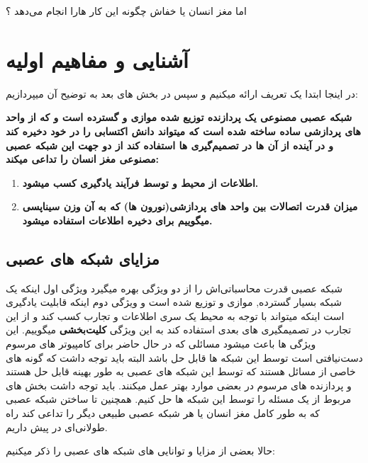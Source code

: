 \documentclass[11pt,a4paper,twocolumn]{article}
\begin{document}
اما مغز انسان یا خفاش چگونه این کار هارا انجام می‌دهد ؟ 
\section{آشنایی و مفاهیم اولیه}
در اینجا ابتدا یک تعریف ارائه میکنیم\cite{haykin}
و سپس در بخش های بعد به توضیح آن میپردازیم:

\textbf{ شبکه عصبی مصنوعی یک پردازنده توزیع شده موازی و گسترده است و که از واحد های پردازشی ساده ساخته شده است که میتواند دانش اکتسابی را در خود دخیره کند و در آینده از آن ها در تصمیم‌گیری ها استفاده کند  از دو جهت این شبکه عصبی مصنوعی  مغز انسان  را تداعی میکند:
}
\begin{enumerate}
\item 
\textbf{اطلاعات از محیط و توسط فرآیند یادگیری کسب میشود.}
 
\item
\textbf{میزان قدرت اتصالات بین واحد های پردازشی(نورون ها) که به آن وزن سیناپسی میگوییم برای دخیره اطلاعات استفاده میشود.}
\end{enumerate}

\subsection{مزایای شبکه های عصبی}
شبکه عصبی قدرت محاسباتی‌اش را از دو ویژگی بهره میگیرد ویژگی اول اینکه یک شبکه بسیار گسترده, موازی و توزیع شده است و ویژگی دوم اینکه قابلیت یادگیری است اینکه میتواند با توجه به محیط یک سری اطلاعات و تجارب کسب کند و از این تجارب در تصمیمگیری های بعدی استفاده کند به این ویژگی
\textbf{کلیت‌بخشی}
میگوییم. این ویژگی ها باعث میشود  مسائلی که در حال حاضر برای کامپیوتر های مرسوم دست‌نیافتی است توسط این شبکه ها قابل حل باشد البته باید توجه داشت که گونه های خاصی از مسائل هستند که توسط این شبکه های عصبی به طور بهینه قابل حل هستند و پردازنده  های مرسوم در بعضی موارد بهتر عمل میکنند. باید توجه داشت بخش های مربوط از یک مسئله را توسط این شبکه ها حل کنیم. همچنین تا ساختن شبکه عصبی که به طور کامل مغز انسان یا هر شبکه عصبی طبیعی دیگر را تداعی کند راه طولانی‌ای در پیش داریم.

حالا بعضی از مزایا و توانایی های شبکه های عصبی را ذکر میکنیم:
\end{document}
